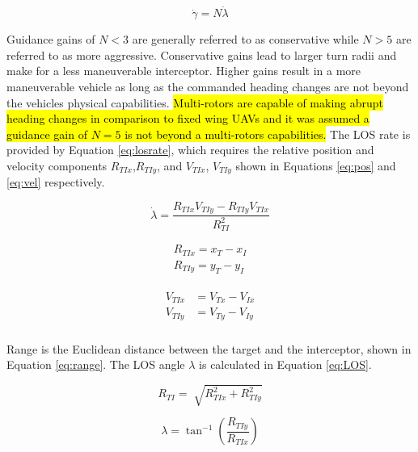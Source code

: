 \documentclass[conference]{IEEEtran}
\begin{document}
\begin{equation} \label{eq:PNlaw}
\dot{\gamma} = N\dot{\lambda}
\end{equation}

Guidance gains of $N < 3$ are generally referred to as conservative while $N > 5$ are referred to as more aggressive. Conservative gains lead to larger turn radii and make for a less maneuverable interceptor. Higher gains result in a more maneuverable vehicle as long as the commanded heading changes are not beyond the vehicles physical capabilities. \hl{Multi-rotors are capable of making abrupt heading changes in comparison to fixed wing UAVs and it was assumed a guidance gain of $N = 5$ is not beyond a multi-rotors capabilities.} The LOS rate is provided by Equation \ref{eq:losrate}, which requires the relative position and velocity components $R_{TIx}$,$R_{TIy}$, and $V_{TIx}$, $V_{TIy}$ shown in Equations \ref{eq:pos} and \ref{eq:vel} respectively. 

\begin{equation} \label{eq:losrate}
\dot{\lambda} = \frac{R_{TIx}V_{TIy}-R_{TIy}V_{TIx}}{R_{TI}^2}
\end{equation}

\begin{equation} \label{eq:pos}
\begin{split}
R_{TIx} = x_T-x_I\\
R_{TIy} = y_T-y_I
\end{split}
\end{equation}

\begin{align}
\label{eq:vel}
\begin{split}
V_{TIx} &= V_{Tx}-V_{Ix}
\\
V_{TIy} &= V_{Ty}-V_{Iy}
\\
\end{split}
\end{align}

Range is the Euclidean distance between the target and the interceptor, shown in Equation \ref{eq:range}. The LOS angle $\lambda$ is calculated in Equation \ref{eq:LOS}. 

\begin{equation} \label{eq:range}
R_{TI} =\sqrt[]{R_{TIx}^2+R_{TIy}^2}
\end{equation}

\begin{equation} \label{eq:LOS}
\lambda = \tan^{-1} \left(\frac{R_{TIy}}{R_{TIx}}\right)
\end{equation}
\end{document}

